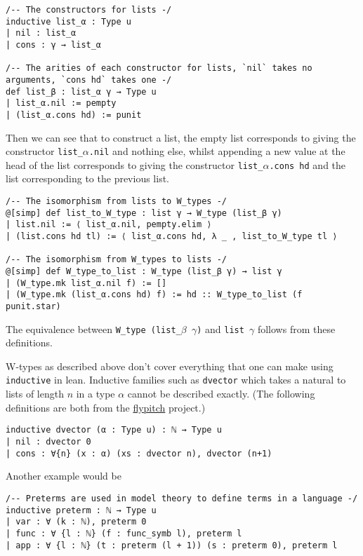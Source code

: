 \documentclass{article}
\newcommand{\al}{\alpha}
\newcommand{\be}{\beta}
\newcommand{\ga}{\gamma}
\newcommand{\<}{\langle}
\renewcommand{\>}{\rangle}
\theoremstyle{definitionstyle}
\theoremstyle{exercisestyle}
\theoremstyle{remarkstyle}
\begin{document}
\begin{lstlisting}
/-- The constructors for lists -/
inductive list_α : Type u
| nil : list_α
| cons : γ → list_α

/-- The arities of each constructor for lists, `nil` takes no arguments, `cons hd` takes one -/
def list_β : list_α γ → Type u
| list_α.nil := pempty
| (list_α.cons hd) := punit \end{lstlisting}

Then we can see that to construct a list,
the empty list corresponds to giving the
constructor \texttt{list\_$\al$.nil} and nothing else,
whilst appending a new value at the head of the list corresponds to
giving the constructor \texttt{list\_$\al$.cons hd} and the
list corresponding to the previous list.

\begin{lstlisting}
/-- The isomorphism from lists to W_types -/
@[simp] def list_to_W_type : list γ → W_type (list_β γ)
| list.nil := ⟨ list_α.nil, pempty.elim ⟩
| (list.cons hd tl) := ⟨ list_α.cons hd, λ _ , list_to_W_type tl ⟩

/-- The isomorphism from W_types to lists -/
@[simp] def W_type_to_list : W_type (list_β γ) → list γ
| (W_type.mk list_α.nil f) := []
| (W_type.mk (list_α.cons hd) f) := hd :: W_type_to_list (f punit.star) \end{lstlisting}

The equivalence between \texttt{W\_type (list\_$\be$ $\ga$)}
and \texttt{list $\ga$} follows from these definitions.

W-types as described above don't cover everything that one can make using
\texttt{inductive} in lean.
Inductive families such as \texttt{dvector} which takes a natural
to lists of length $n$ in a type $\al$ cannot be described exactly.
(The following definitions are both from the \href{https://github.com/flypitch/flypitch}{flypitch} project.)

\begin{lstlisting}
inductive dvector (α : Type u) : ℕ → Type u
| nil : dvector 0
| cons : ∀{n} (x : α) (xs : dvector n), dvector (n+1) \end{lstlisting}

Another example would be

\begin{lstlisting}
/-- Preterms are used in model theory to define terms in a language -/
inductive preterm : ℕ → Type u
| var : ∀ (k : ℕ), preterm 0
| func : ∀ {l : ℕ} (f : func_symb l), preterm l
| app : ∀ {l : ℕ} (t : preterm (l + 1)) (s : preterm 0), preterm l \end{lstlisting}
\end{document}
